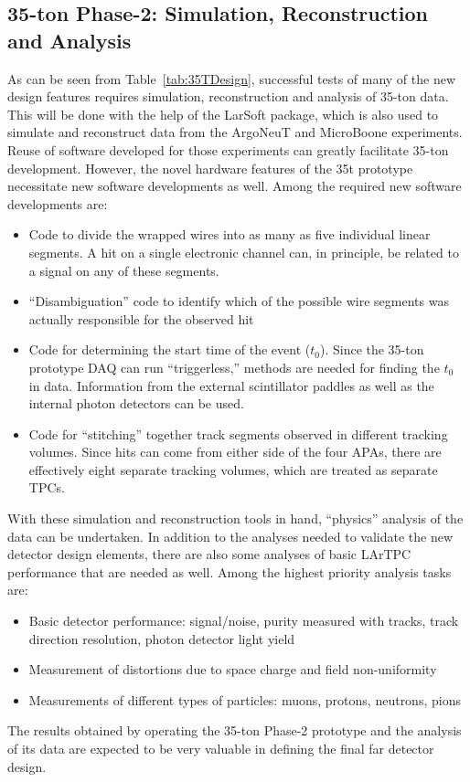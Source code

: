 \subsection{35-ton Phase-2: Simulation, Reconstruction and Analysis}
As can be seen from Table~\ref{tab:35TDesign}, successful tests of many of the new 
design features requires simulation, reconstruction and analysis of 35-ton data. 
This will be done with the help of the LarSoft package, which is also used to simulate and 
reconstruct data from the ArgoNeuT and MicroBoone experiments.
Reuse of software developed for those experiments can greatly facilitate 35-ton development. 
However, the novel hardware features of the 35t prototype necessitate new software developments 
as well.  
Among the required new software developments are:
\begin{itemize}
\item{Code to divide the wrapped wires into as many as five individual linear segments. 
A hit on a single electronic channel can, in principle, be related to a
signal on any of these segments.}
\item{``Disambiguation'' code to identify which of the possible wire segments was actually responsible
for the observed hit}
\item{Code for determining the start time of the event ($t_0$). Since the 35-ton prototype DAQ can
run ``triggerless,'' methods are needed for finding the $t_0$ in data. Information from the external 
scintillator paddles as well as the internal photon detectors can be used.}
\item{Code for ``stitching'' together track segments observed in different tracking volumes. 
Since hits can come from either side of the four APAs, there are 
effectively eight separate tracking volumes, 
which are treated as separate TPCs.}
\end{itemize}

With these simulation and reconstruction tools in hand, ``physics''
analysis of the data can be undertaken.
In addition to the analyses needed to validate the new detector design elements, there are also
some analyses of basic LArTPC performance that are needed as well.
Among the highest priority analysis tasks are:

\begin{itemize}
\item{Basic detector performance: signal/noise, purity measured with tracks, track direction resolution, 
photon detector light yield}
\item{Measurement of distortions due to space charge and field non-uniformity}
\item{Measurements of different types of particles: muons, protons, neutrons, pions}
\end{itemize}

The results obtained by operating the 35-ton Phase-2 prototype and the analysis of its data are expected
to be very valuable in defining the final far detector design. 
